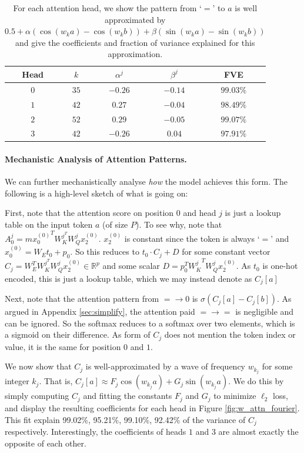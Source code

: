 \documentclass{article} %
\begin{document}
\begin{table}[]
    \centering
    \small
    \begin{tabular}{c|c|c|c|c}
         Head & $k$ & $\alpha^j$ & $\beta^j$ & FVE\\
         \hline 
         $0$ & $35$ & $-0.26$ & $-0.14$ & $99.03\%$\\
        $1$ & $42$ & $0.27$ & $-0.04$ & $98.49\%$\\
        $2$ & $52$ & $0.29$ & $-0.05$ & $99.07\%$\\
        $3$ & $42$ & $-0.26$ & $0.04$ & $97.91\%$\\
    \end{tabular}
    \caption{For each attention head, we show the pattern from `$=$' to $a$ is well approximated by $0.5 + \alpha (\cos(w_k a) - \cos(w_k b)) + \beta(\sin(w_k a) - \sin(w_k b))$ and give the coefficients and fraction of variance explained for this approximation.}
    \label{tab:attn-activation-projections}
\end{table}

\paragraph{Mechanistic Analysis of Attention Patterns.}

We can further mechanistically analyse \textit{how} the model achieves this form. The following is a high-level sketch of what is going on:

First, note that the attention score on position $0$ and head $j$ is just a lookup table on the input token $a$ (of size $P$). To see why, note that $A^j_0 ={mx^{(0)}_0}^T W_K^{j^T} W_Q^j x^{(0)}_2$. $x^{(0)}_2$ is constant since the token is always `$=$' and 
$x^{(0)}_0=W_Et_0+p_0$. So this reduces to $t_0 \cdot C_j+D$ for some constant vector $C_j=W_E^T W_K^{j^T} W_Q^j x^{(0)}_2\in \mathbb{R}^p$ and some scalar $D=p_0^T {W_K^j}^T W_Q^j x^{(0)}_2$. As $t_0$ is one-hot encoded, this is just a lookup table, which we may instead denote as $C_j[a]$

Next, note that the attention pattern from $=\to 0$ is $\sigma(C_j[a]-C_j[b])$. As argued in Appendix \ref{sec:simplify}, the attention paid $=\to=$ is negligible and can be ignored. So the softmax reduces to a softmax over two elements, which is a sigmoid on their difference. As form of $C_j$ does not mention the token index or value, it is the same for position $0$ and $1$. 

We now show that $C_j$ is well-approximated by a wave of frequency $w_{k_j}$ for some integer $k_j$. That is, $C_j[a] \approx F_j\cos(w_{k_j} a) + G_j \sin(w_{k_j} a)$. We do this by simply computing $C_j$ and fitting the constants $F_j$ and $G_j$ to minimize $\ell_2$ loss, and display the resulting coefficients for each head in Figure \ref{fig:w_attn_fourier}. This fit explain 99.02\%, 95.21\%, 99.10\%, 92.42\% of the variance of $C_j$ respectively. Interestingly, the coefficients of heads $1$ and $3$ are almost exactly the opposite of each other. 
\end{document}
